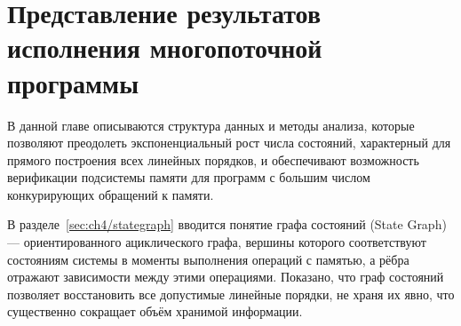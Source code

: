 \chapter{Представление результатов исполнения
многопоточной программы}
\label{sec:ch4}







В данной главе описываются структура данных и методы анализа, которые
позволяют преодолеть экспоненциальный рост числа состояний,
характерный для прямого построения всех линейных порядков, и
обеспечивают возможность верификации подсистемы памяти для программ с
большим числом конкурирующих обращений к памяти.

В разделе~\ref{sec:ch4/stategraph} вводится понятие графа состояний
(State Graph) — ориентированного ациклического графа, вершины
которого соответствуют состояниям системы в моменты выполнения
операций с памятью, а рёбра отражают зависимости между этими
операциями. Показано, что граф состояний позволяет восстановить все
допустимые линейные порядки, не храня их явно, что существенно
сокращает объём хранимой информации.

